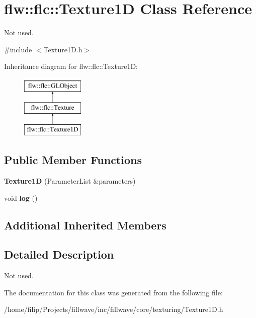 \hypertarget{classflw_1_1flc_1_1Texture1D}{}\section{flw\+:\+:flc\+:\+:Texture1D Class Reference}
\label{classflw_1_1flc_1_1Texture1D}


Not used.  




{\ttfamily \#include $<$Texture1\+D.\+h$>$}

Inheritance diagram for flw\+:\+:flc\+:\+:Texture1D\+:\begin{figure}[H]
\begin{center}
\leavevmode
\includegraphics[height=3.000000cm]{classflw_1_1flc_1_1Texture1D}
\end{center}
\end{figure}
\subsection*{Public Member Functions}
\begin{DoxyCompactItemize}
\item 
{\bfseries Texture1D} (Parameter\+List \&parameters)\hypertarget{classflw_1_1flc_1_1Texture1D_afe75a5423103cfb21e5369bdb8651875}{}\label{classflw_1_1flc_1_1Texture1D_afe75a5423103cfb21e5369bdb8651875}

\item 
void {\bfseries log} ()\hypertarget{classflw_1_1flc_1_1Texture1D_a475479ca8453099d25315dad60c7b279}{}\label{classflw_1_1flc_1_1Texture1D_a475479ca8453099d25315dad60c7b279}

\end{DoxyCompactItemize}
\subsection*{Additional Inherited Members}


\subsection{Detailed Description}
Not used. 

The documentation for this class was generated from the following file\+:\begin{DoxyCompactItemize}
\item 
/home/filip/\+Projects/fillwave/inc/fillwave/core/texturing/Texture1\+D.\+h\end{DoxyCompactItemize}

